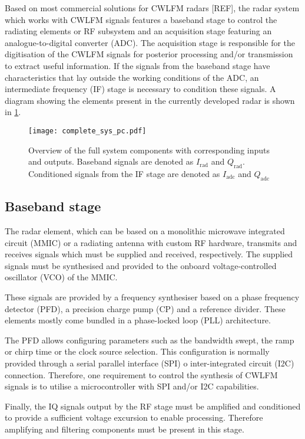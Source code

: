 Based on most commercial solutions for CWLFM radars [REF], the radar system which works with CWLFM signals features a baseband stage to control the radiating elements or RF subsystem and an acquisition stage featuring an analogue-to-digital converter (ADC). The acquisition stage is responsible for the digitisation of the CWLFM signals for posterior processing and/or transmission to extract useful information. If the signals from the baseband stage have characteristics that lay outside the working conditions of the ADC, an intermediate frequency (IF) stage is necessary to condition these signals. A diagram showing the elements present in the currently developed radar is shown in \cref{fig:system}.

\begin{figure}[ht]
	\centering
	\texttt{[image: complete\_sys\_pc.pdf]}
	\caption{Overview of the full system components with corresponding inputs and outputs. Baseband signals are denoted as $I_{\mathrm{rad}}$ and $Q_{\mathrm{rad}}$. Conditioned signals from the IF stage are denoted as $I_{\mathrm{adc}}$ and $Q_{\mathrm{adc}}$ \label{fig:system}}
\end{figure}

\subsection{Baseband stage} \label{sec:baseband_general}

The radar element, which can be based on a monolithic microwave integrated circuit (MMIC) or a radiating antenna with custom RF hardware, transmits and receives signals which must be supplied and received, respectively. The supplied signals must be synthesised and provided to the onboard voltage-controlled oscillator (VCO) of the MMIC.

These signals are provided by a frequency synthesiser based on a phase frequency detector (PFD), a precision charge pump (CP) and a reference divider. These elements mostly come bundled in a phase-locked loop (PLL) architecture.

The PFD allows configuring parameters such as the bandwidth swept, the ramp or chirp time or the clock source selection. This configuration is normally provided through a serial parallel interface (SPI) o inter-integrated circuit (I2C) connection. Therefore, one requirement to control the synthesis of CWLFM signals is to utilise a microcontroller with SPI and/or I2C capabilities.

Finally, the IQ signals output by the RF stage must be amplified and conditioned to provide a sufficient voltage excursion to enable processing. Therefore amplifying and filtering components must be present in this stage.

